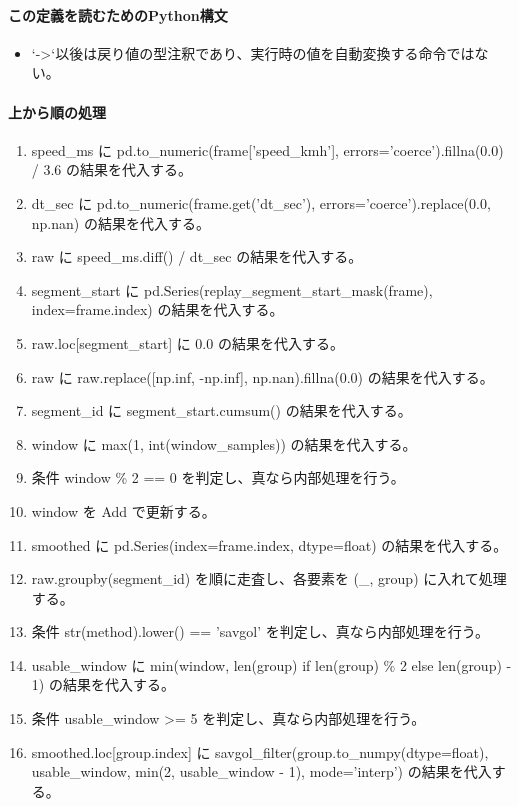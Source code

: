 \documentclass[a4paper,11pt]{article}
\begin{document}
            \paragraph{この定義を読むためのPython構文}
            \begin{itemize}[leftmargin=1.6em]
            \item `->`以後は戻り値の型注釈であり、実行時の値を自動変換する命令ではない。
            \end{itemize}
            \paragraph{上から順の処理}
            \begin{enumerate}[leftmargin=1.8em]
            \item speed\_ms に pd.to\_numeric(frame['speed\_kmh'], errors='coerce').fillna(0.0) / 3.6 の結果を代入する。
\item dt\_sec に pd.to\_numeric(frame.get('dt\_sec'), errors='coerce').replace(0.0, np.nan) の結果を代入する。
\item raw に speed\_ms.diff() / dt\_sec の結果を代入する。
\item segment\_start に pd.Series(replay\_segment\_start\_mask(frame), index=frame.index) の結果を代入する。
\item raw.loc[segment\_start] に 0.0 の結果を代入する。
\item raw に raw.replace([np.inf, -np.inf], np.nan).fillna(0.0) の結果を代入する。
\item segment\_id に segment\_start.cumsum() の結果を代入する。
\item window に max(1, int(window\_samples)) の結果を代入する。
\item 条件 window \% 2 == 0 を判定し、真なら内部処理を行う。
\item   window を Add で更新する。
\item smoothed に pd.Series(index=frame.index, dtype=float) の結果を代入する。
\item raw.groupby(segment\_id) を順に走査し、各要素を (\_, group) に入れて処理する。
\item   条件 str(method).lower() == 'savgol' を判定し、真なら内部処理を行う。
\item     usable\_window に min(window, len(group) if len(group) \% 2 else len(group) - 1) の結果を代入する。
\item     条件 usable\_window >= 5 を判定し、真なら内部処理を行う。
\item       smoothed.loc[group.index] に savgol\_filter(group.to\_numpy(dtype=float), usable\_window, min(2, usable\_window - 1), mode='interp') の結果を代入する。

\end{enumerate}
\end{document}
